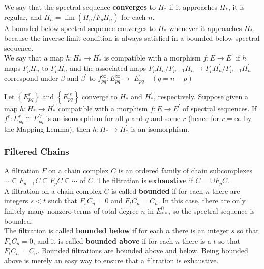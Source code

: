 We say that the spectral sequence \textbf{converges} to $H_*$ if it approaches $H_*$, it is regular, and $H_n=\lim \left(H_n / F_p H_n\right)$ for each $n$.\\ 
A bounded below spectral sequence converges to $H_*$ whenever it approaches $H_*$, because the inverse limit condition is always satisfied in a bounded below spectral sequence.\\
We say that a map $h: H_* \rightarrow H_*^{\prime}$ is compatible with a morphism $f: E \rightarrow E^{\prime}$ if $h$ maps $F_p H_n$ to $F_p H_n^{\prime}$ and the associated maps $F_p H_n / F_{p-1} H_n \rightarrow F_p H_n^{\prime} / F_{p-1} H_n^{\prime}$ correspond under $\beta$ and $\beta^{\prime}$ to $f_{p q}^{\infty}: E_{p q}^{\infty} \rightarrow$ $E_{p q}^{\prime} \quad(q=n-p)$

\begin{theo}
Let $\left\{E_{p q}^r\right\}$ and $\left\{E_{p q}^{\prime r}\right\}$ converge to $H_*$ and $H_*^{\prime}$, respectively. Suppose given a map $h: H_* \rightarrow H_*^{\prime}$ compatible with a morphism $f: E \rightarrow E^{\prime}$ of spectral sequences. If $f^r: E_{p q}^r \cong E_{p q}^{\prime r}$ is an isomorphism for all $p$ and $q$ and some $r$ (hence for $r=\infty$ by the Mapping Lemma), then $h: H_* \rightarrow H_*^{\prime}$ is an isomorphism. 
\end{theo}

\subsubsection*{Filtered Chains}
A filtration $F$ on a chain complex $C$ is an ordered family of chain subcomplexes $\cdots \subseteq F_{p-1} C \subseteq F_p C \subseteq \cdots$ of $C$. The filtration is \textbf{exhaustive} if $C=\cup F_p C$. \\
A filtration on a chain complex $C$ is called \textbf{bounded} if for each $n$ there are integers $s<t$ such that $F_s C_n=0$ and $F_t C_n=C_n$. In this case, there are only finitely many nonzero terms of total degree $n$ in $E_{* *}^0$, so the spectral sequence is bounded.\\
The filtration is called \textbf{bounded below} if for each $n$ there is an integer $s$ so that $F_s C_n=0$, and it is called \textbf{bounded above} if for each $n$ there is a $t$ so that $F_t C_n=C_n$. Bounded filtrations are bounded above and below. Being bounded above is merely an easy way to ensure that a filtration is exhaustive. %

